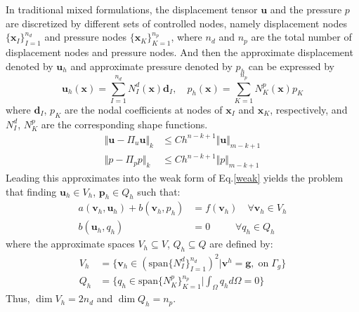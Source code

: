 In traditional mixed formulations, the displacement tensor $\boldsymbol u$ and the pressure $p$ are discretized by different sets of controlled nodes, namely displacement nodes $\{\boldsymbol x_I\}_{I=1}^{n_d}$ and pressure nodes $\{\boldsymbol x_K\}_{K=1}^{n_p}$, where $n_d$ and $n_p$ are the total number of displacement nodes and pressure nodes. And then the approximate displacement denoted by $\boldsymbol u_h$ and approximate pressure denoted by $p_h$ can be expressed by  
\begin{equation}\label{approx}
    \boldsymbol u_h(\boldsymbol x) = \sum_{I=1}^{n_d} N_I^d(\boldsymbol x) \boldsymbol d_I, \quad
    p_h(\boldsymbol x) = \sum_{K=1}^{n_p} N_K^p(\boldsymbol x) p_K
\end{equation}
where $\boldsymbol d_I$, $p_K$ are the nodal coefficients at nodes of $\boldsymbol x_I$ and $\boldsymbol x_K$, respectively, and $N_I^d$, $N_K^p$ are the corresponding shape functions.
\begin{align}
    \Vert \boldsymbol u - \Pi_u \boldsymbol u \Vert_k &\le Ch^{n-k+1} \Vert \boldsymbol u \Vert_{m-k+1} \\
    \Vert p - \Pi_p p \Vert_k &\le Ch^{n-k+1} \Vert p \Vert_{m-k+1}
\end{align}
Leading this approximates into the weak form of Eq.\eqref{weak} yields the problem that finding $\boldsymbol u_h \in V_h$, $\boldsymbol p_h \in Q_h$ such that:
\begin{equation}\label{approxweak}
    \begin{split}
        a(\boldsymbol v_h, \boldsymbol u_h) + b(\boldsymbol v_h, p_h) &= f(\boldsymbol v_h)  \quad \forall \boldsymbol v_h \in V_h \\
        b(\boldsymbol u_h,q_h) &= 0 \qquad \;\; \forall q_h \in Q_h
    \end{split}
\end{equation}
where the approximate spaces $V_h \subseteq V$, $Q_h \subseteq Q$ are defined by:
\begin{align}
    V_h &= \{\boldsymbol v_h \in (\mathrm{span}\{N_I^d\}_{I=1}^{n_d})^2 \vert \boldsymbol v^h = \boldsymbol g,\; \mathrm{on} \; \Gamma_g\} \\
    Q_h &= \{q_h \in \mathrm{span}\{N_K^p\}_{K=1}^{n_p} \vert \int_{\Omega} q_h d\Omega = 0\}
\end{align}
Thus, $\dim V_h = 2n_d$ and $\dim Q_h = n_p$.

